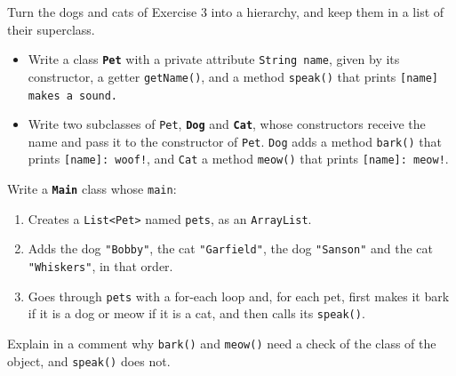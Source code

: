 Turn the dogs and cats of Exercise 3 into a hierarchy, and keep them in a list of their superclass.

\begin{itemize}

    \item Write a class \textbf{\texttt{Pet}} with a private attribute \texttt{String name}, given by its constructor, a getter \texttt{getName()}, and a method \texttt{speak()} that prints \texttt{[name] makes a sound.}

    \item Write two subclasses of \texttt{Pet}, \textbf{\texttt{Dog}} and \textbf{\texttt{Cat}}, whose constructors receive the name and pass it to the constructor of \texttt{Pet}. \texttt{Dog} adds a method \texttt{bark()} that prints \texttt{[name]: woof!}, and \texttt{Cat} a method \texttt{meow()} that prints \texttt{[name]: meow!}.

\end{itemize}

Write a \textbf{\texttt{Main}} class whose \texttt{main}:

\begin{enumerate}

    \item Creates a \texttt{List<Pet>} named \texttt{pets}, as an \texttt{ArrayList}.

    \item Adds the dog \texttt{"Bobby"}, the cat \texttt{"Garfield"}, the dog \texttt{"Sanson"} and the cat \texttt{"Whiskers"}, in that order.

    \item Goes through \texttt{pets} with a for-each loop and, for each pet, first makes it bark if it is a dog or meow if it is a cat, and then calls its \texttt{speak()}.

\end{enumerate}

Explain in a comment why \texttt{bark()} and \texttt{meow()} need a check of the class of the object, and \texttt{speak()} does not.
